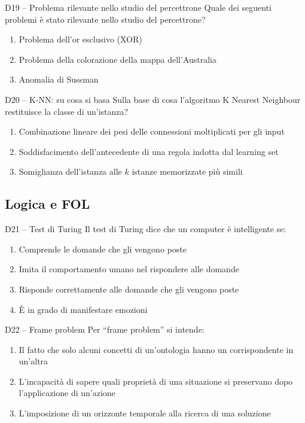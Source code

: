 \documentclass[12pt,a4paper]{article}
\begin{document}
\begin{domanda}{D19 -- Problema rilevante nello studio del percettrone}
Quale dei seguenti problemi è stato rilevante nello studio del percettrone?
\begin{enumerate}[label=\alph*.]
  \item Problema dell'or esclusivo (XOR)
  \item Problema della colorazione della mappa dell'Australia
  \item Anomalia di Sussman
\end{enumerate}
\end{domanda}

\begin{domanda}{D20 -- K-NN: su cosa si basa}
Sulla base di cosa l'algoritmo K Nearest Neighbour restituisce la classe di un'istanza?
\begin{enumerate}[label=\alph*.]
  \item Combinazione lineare dei pesi delle connessioni moltiplicati per gli input
  \item Soddisfacimento dell'antecedente di una regola indotta dal learning set
  \item Somiglianza dell'istanza alle $k$ istanze memorizzate più simili
\end{enumerate}
\end{domanda}

\subsection{Logica e FOL}

\begin{domanda}{D21 -- Test di Turing}
Il test di Turing dice che un computer è intelligente se:
\begin{enumerate}[label=\alph*.]
  \item Comprende le domande che gli vengono poste
  \item Imita il comportamento umano nel rispondere alle domande
  \item Risponde correttamente alle domande che gli vengono poste
  \item È in grado di manifestare emozioni
\end{enumerate}
\end{domanda}

\begin{domanda}{D22 -- Frame problem}
Per ``frame problem'' si intende:
\begin{enumerate}[label=\alph*.]
  \item Il fatto che solo alcuni concetti di un'ontologia hanno un corrispondente in un'altra
  \item L'incapacità di sapere quali proprietà di una situazione si preservano dopo l'applicazione di un'azione
  \item L'imposizione di un orizzonte temporale alla ricerca di una soluzione
\end{enumerate}
\end{domanda}
\end{document}
